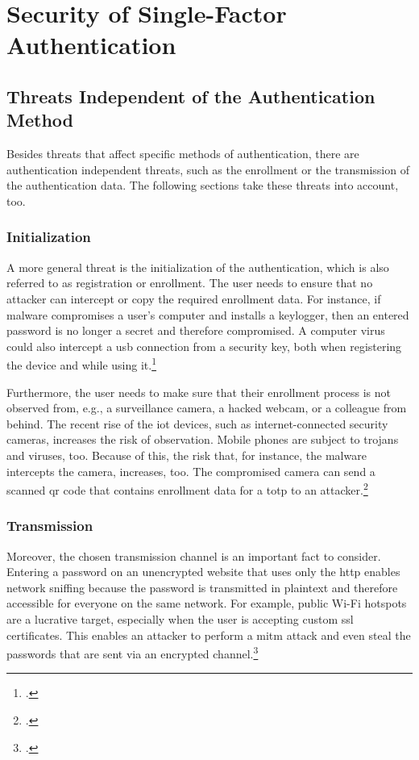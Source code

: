 \chapter{Security of Single-Factor Authentication}
\label{chap:one-factor-security}

\section{Threats Independent of the Authentication Method}

Besides threats that affect specific methods of authentication, there are authentication independent threats, such as the enrollment or the transmission of the authentication data. The following sections take these threats into account, too.

\subsection{Initialization}

A more general threat is the initialization of the authentication, which is also referred to as registration or enrollment. The user needs to ensure that no attacker can intercept or copy the required enrollment data. For instance, if malware compromises a user’s computer and installs a keylogger, then an entered password is no longer a secret and therefore compromised. A computer virus could also intercept a \gls{usb} connection from a security key, both when registering the device and while using it.\footcites[See][61]{Ulqinaku:2019:FPP:3317549.3323404}

Furthermore, the user needs to make sure that their enrollment process is not observed from, e.g., a surveillance camera, a hacked webcam, or a colleague from behind. The recent rise of the \gls{iot} devices, such as internet-connected security cameras, increases the risk of observation. Mobile phones are subject to trojans and viruses, too. Because of this, the risk that, for instance, the malware intercepts the camera, increases, too. The compromised camera can send a scanned \gls{qr} code that contains enrollment data for a \gls{totp} to an attacker.\footcites[See][152--153]{10.1007/978-3-642-39235-1_9}[See][371--375]{10.1007/978-3-662-45472-5_24}

\subsection{Transmission}

Moreover, the chosen transmission channel is an important fact to consider. Entering a password on an unencrypted website that uses only the \gls{http} enables network sniffing because the password is transmitted in plaintext and therefore accessible for everyone on the same network. For example, public Wi-Fi hotspots are a lucrative target, especially when the user is accepting custom \gls{ssl} certificates. This enables an attacker to perform a \gls{mitm} attack and even steal the passwords that are sent via an encrypted channel.\footcites[See][518]{10.1007/978-3-030-21548-4_28}

